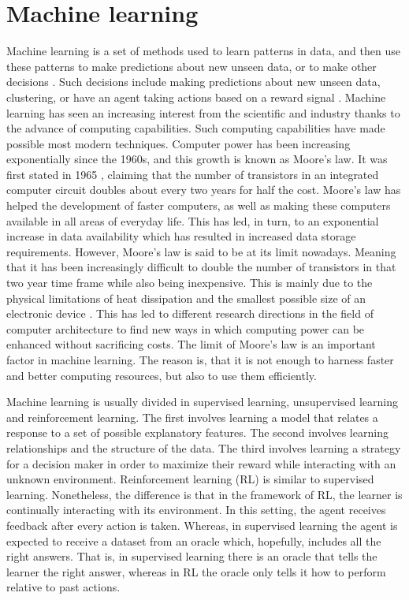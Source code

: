 
\chapter{Machine learning}
\label{ch:machine_learning}

Machine learning is a set of methods used to learn patterns in data, and then use these patterns to make predictions about new unseen data, or to make other decisions \cite{murphy2012machine}. Such decisions include making predictions about new unseen data, clustering, or have an agent taking actions based on a reward signal \cite{murphy2012machine, sutton1998reinforcement}. Machine learning has seen an increasing interest from the scientific and industry thanks to the advance of computing capabilities. Such computing capabilities have made possible most modern techniques. Computer power has been increasing exponentially since the 1960s, and this growth is known as Moore's law. It was first stated in 1965 \cite{moore2006cramming, moore1975progress}, claiming that the number of transistors in an integrated computer circuit doubles about every two years for half the cost. Moore's law has helped the development of faster computers, as well as making these computers available in all areas of everyday life. This has led, in turn, to an exponential increase in data availability which has resulted in increased data storage requirements. However, Moore's law is said to be at its limit nowadays. Meaning that it has been increasingly difficult to double the number of transistors in that two year time frame while also being inexpensive. This is mainly due to the physical limitations of heat dissipation and the smallest possible size of an electronic device \cite{kumar2018end}. This has led to different research directions in the field of computer architecture to find new ways in which computing power can be enhanced without sacrificing costs. The limit of Moore's law is an important factor in machine learning. The reason is, that it is not enough to harness faster and better computing resources, but also to use them efficiently.

Machine learning is usually divided in supervised learning, unsupervised learning and reinforcement learning. The first involves learning a model that relates a response to a set of possible explanatory features. The second involves learning relationships and the structure of the data. The third involves learning a strategy for a decision maker in order to maximize their reward while interacting with an unknown environment. Reinforcement learning (RL) is similar to supervised learning. Nonetheless, the difference is that in the framework of RL, the learner is continually interacting with its environment. In this setting, the agent receives feedback after every action is taken. Whereas, in supervised learning the agent is expected to  receive a dataset from an oracle which, hopefully, includes all the right answers. That is, in supervised learning there is an oracle that tells the learner the right answer, whereas in RL the oracle only tells it how to perform relative to past actions.

